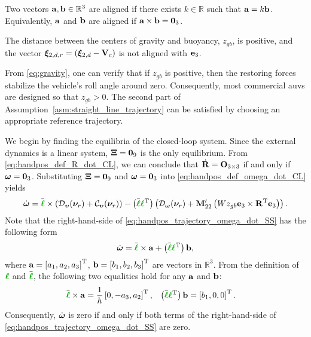 \begin{dfn}
    Two vectors $\mathbf{a}, \mathbf{b} \in \mathbb{R}^3$ are aligned if there exists $k \in \mathbb{R}$ such that $\mathbf{a} = k\mathbf{b}$.
    Equivalently, $\mathbf{a}$ and $\mathbf{b}$ are aligned if $\mathbf{a} \times \mathbf{b} = \mathbf{0}_3$.
    \label{dfn:aligned}
\end{dfn}
\begin{asm}
    The distance between the centers of gravity and buoyancy, $z_{gb}$, is positive, and the vector $\bm{\xi}_{2, d, r} = (\bm{\xi}_{2, d} - \mathbf{V}_c)$ is not aligned with $\mathbf{e}_3$.
    \label{asm:straight_line_trajectory}
\end{asm}
\begin{rmk*}
    From \eqref{eq:gravity}, one can verify that if $z_{gb}$ is positive, then the restoring forces stabilize the vehicle's roll angle around zero.
    Consequently, most commercial \glspl{auv} are designed so that $z_{gb} > 0$.
    The second part of Assumption~\ref{asm:straight_line_trajectory} can be satisfied by choosing an appropriate reference trajectory.
\end{rmk*}

We begin by finding the equilibria of the closed-loop system.
Since the external dynamics is a linear system, $\bm{\Xi} = \mathbf{0}_9$ is the only equilibrium.
From \eqref{eq:handpos_def_R_dot_CL}, we can conclude that $\dot{\mathbf{R}} = \mathbf{O}_{3 \times 3}$ if and only if $\bm{\omega} = \mathbf{0}_3$.
Substituting $\bm{\Xi} = \mathbf{0}_9$ and $\bm{\omega} = \mathbf{0}_3$ into \eqref{eq:handpos_def_omega_dot_CL} yields
\begin{equation}
        \dot{\bs{\omega}} = \Bar{\dm{\handl}} \times \left(\mathcal{D}_{\bvel}(\vel_r) + \mathcal{C}_{\bvel}(\vel_r)\right) 
        - \left(\Bar{\dm{\handl}}\dm{\handl}\T\right) \left(\mathcal{D}_{\bs{\omega}}(\vel_r) + \mat{M}_{22}^{\prime}\left(Wz_{gb} \mat{e}_3 \times \mat{R}\T \mat{e}_3\right)\right).
    \label{eq:handpos_trajectory_omega_dot_SS}
\end{equation}
Note that the right-hand-side of \eqref{eq:handpos_trajectory_omega_dot_SS} has the following form
\begin{equation}
    \dot{\bs{\omega}} = \Bar{\dm{\handl}} \times \mat{a} + \left(\Bar{\dm{\handl}}\dm{\handl}\T\right) \mat{b},
\end{equation}
where $\mathbf{a} = \left[a_1, a_2, a_3\right]^{\mathrm{T}}$, $\mathbf{b} = \left[b_1, b_2, b_3\right]^{\mathrm{T}}$ are vectors in $\mathbb{R}^3$.
From the definition of $\dm{\handl}$ and $\Bar{\dm{\handl}}$, the following two equalities hold for any $\mathbf{a}$ and $\mathbf{b}$:
\begin{align}
    \Bar{\dm{\handl}} \times \mat{a} &= \frac{1}{h} \inlinevector{0, -a_3, a_2}, &
    \left(\Bar{\dm{\handl}}\dm{\handl}\T\right) \mat{b} &= \inlinevector{b_1, 0, 0}.
\end{align}
Consequently, $\dot{\bm{\omega}}$ is zero if and only if both terms of the right-hand-side of \eqref{eq:handpos_trajectory_omega_dot_SS} are zero.

